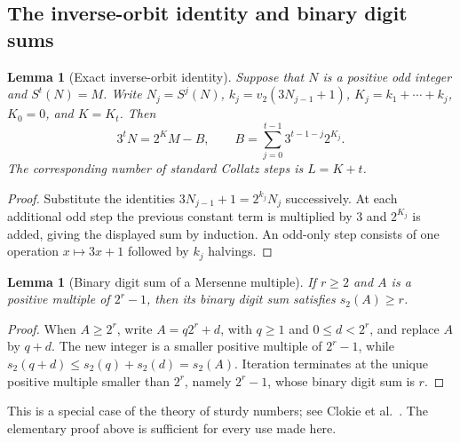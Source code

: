 \documentclass[11pt,a4paper]{article}
\newtheorem{lemma}[theorem]{Lemma}
\theoremstyle{definition}
\theoremstyle{remark}
\numberwithin{equation}{section}
\begin{document}
\subsection{The inverse-orbit identity and binary digit sums}
\begin{lemma}[Exact inverse-orbit identity]\label{A:lem:inverse-identity}
Suppose that $N$ is a positive odd integer and $S^t(N)=M$. Write
$N_j=S^j(N)$, $k_j=v_2(3N_{j-1}+1)$,
$K_j=k_1+\cdots+k_j$, $K_0=0$, and $K=K_t$. Then
\begin{equation}
 3^tN=2^KM-B,\qquad
 B=\sum_{j=0}^{t-1}3^{t-1-j}2^{K_j}.
 \label{A:eq:inverse-identity}
\end{equation}
The corresponding number of standard Collatz steps is $L=K+t$.
\end{lemma}
\begin{proof}
Substitute the identities $3N_{j-1}+1=2^{k_j}N_j$ successively.
At each additional odd step the previous constant term is multiplied by
$3$ and $2^{K_j}$ is added, giving the displayed sum by induction.
An odd-only step consists of one operation $x\mapsto3x+1$ followed by
$k_j$ halvings.
\end{proof}

\begin{lemma}[Binary digit sum of a Mersenne multiple]\label{A:lem:mersenne-sturdy}
If $r\ge2$ and $A$ is a positive multiple of $2^r-1$, then its binary
digit sum satisfies $s_2(A)\ge r$.
\end{lemma}
\begin{proof}
When $A\ge2^r$, write $A=q2^r+d$, with $q\ge1$ and $0\le d<2^r$,
and replace $A$ by $q+d$. The new integer is a smaller positive multiple
of $2^r-1$, while
$s_2(q+d)\le s_2(q)+s_2(d)=s_2(A)$.
Iteration terminates at the unique positive multiple smaller than $2^r$,
namely $2^r-1$, whose binary digit sum is $r$.
\end{proof}
This is a special case of the theory of sturdy numbers; see
Clokie et al.~\cite{R013}. The elementary proof above is sufficient
for every use made here.
\end{document}
